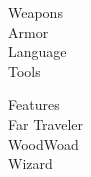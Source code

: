 \documentclass[a4paper,10pt,bg=full]{dndbook} %
\def\CharaClass{Wizard}
\def\Background{Far Traveler}
\def\Race{WoodWoad}
\begin{document}
	\begin{minipage}[t]{.25\linewidth}\Fontauri\normalsize
		\textcolor{titlered}{\large Weapons}\\
		
		\textcolor{titlered}{\large Armor}\\
		
		\textcolor{titlered}{\large Language}\\
		
		\textcolor{titlered}{\large Tools}\\
	\end{minipage}%
	\begin{minipage}[t]{.5\linewidth}\raggedleft \Fontauri\normalsize
		{\huge Features}\\
		\textcolor{titlered}{\large \Background}\\
		
		\textcolor{titlered}{\large \Race}\\
		
		\textcolor{titlered}{\large \CharaClass}\\
	\end{minipage} %
	
	
\end{document}
